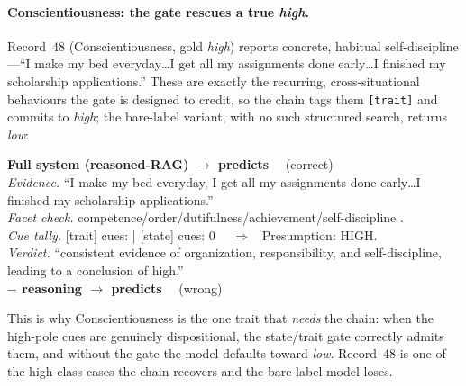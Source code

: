\documentclass[../main.tex]{subfiles}
\begin{document}
\paragraph{Conscientiousness: the gate rescues a true \textit{high}.}
Record~48 (Conscientiousness, gold \textit{high}) reports concrete, habitual
self-discipline---``I make my bed everyday\dots I get all my assignments done
early\dots I finished my scholarship applications.'' These are exactly the
recurring, cross-situational behaviours the gate is designed to credit, so the
chain tags them \texttt{[trait]} and commits to \textit{high}; the bare-label
variant, with no such structured search, returns \textit{low}:
%
\begin{llmbox}[title={Record 48 -- Conscientiousness (gold: high)}]
\textbf{Full system (reasoned-RAG) $\rightarrow$ predicts } ~~(correct)\\
\textit{Evidence.} \hi{[trait]} ``I make my bed everyday, I get all my assignments done early\dots I finished my scholarship applications.''\\
\textit{Facet check.} competence/order/dutifulness/achievement/self-discipline .\\
\textit{Cue tally.} [trait] cues:  | [state] cues: 0 ~~$\Rightarrow$~ Presumption: HIGH.\\
\textit{Verdict.} ``consistent evidence of organization, responsibility, and self-discipline, leading to a conclusion of high.''\\[4pt]
\textbf{$-$ reasoning $\rightarrow$ predicts } ~~(wrong)
\end{llmbox}
%
This is why Conscientiousness is the one trait that \emph{needs} the chain:
when the high-pole cues are genuinely dispositional, the state/trait gate
correctly admits them, and without the gate the model defaults toward
\textit{low}. Record~48 is one of the high-class cases the chain recovers and
the bare-label model loses.
\end{document}
